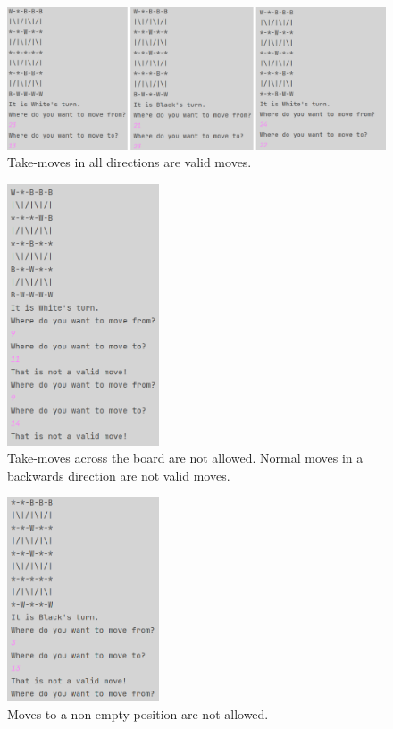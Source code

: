 \documentclass[12pt, a4paper]{article}
\begin{document}
\begin{figure}[h]
	\centering
	\caption*{Take-moves in all directions are valid moves.}
	\includegraphics[width=1\textwidth]{isLegalProf/3in1.png}	
\end{figure}

\begin{figure}[h]
	\centering
	\caption*{Take-moves across the board are not allowed. Normal moves in a backwards direction are not valid moves.}
	\includegraphics[width=0.4\textwidth]{isLegalProf/IkkeRykkeBagudEllerOutOfBounds.png}	
\end{figure}

\begin{figure}[h]
	\centering
	\caption*{Moves to a non-empty position are not allowed.}
	\includegraphics[width=0.4\textwidth]{isLegalProf/MåIkkeRykkeTilFelterDerStårEnBrik.png}	
\end{figure}
\clearpage
\end{document}
